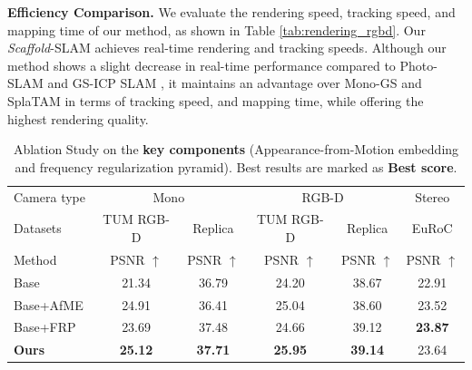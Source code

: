 \noindent\textbf{Efficiency Comparison.}
We evaluate the rendering speed, tracking speed, and mapping time of our method, as shown in Table \ref{tab:rendering_rgbd}. Our \emph{Scaffold}-SLAM achieves real-time rendering and tracking speeds.  Although our method shows a slight decrease in real-time performance compared to Photo-SLAM \cite{Photo-SLAM2024} and GS-ICP SLAM \cite{GS-ICPSLAM2024}, it maintains an advantage over Mono-GS \cite{MonoGS2024} and SplaTAM \cite{SplaTAM2024} in terms of tracking speed, and mapping time, while offering the highest rendering quality.


\begin{table}
\scriptsize
  \centering
   \setlength\tabcolsep{4.5pt} 
  \begin{tabular}{@{}l|cc|cc|c} %
    \hline  
   Camera type & \multicolumn{2}{c|}{Mono} & \multicolumn{2}{c|}{RGB-D} & Stereo\\
   Datasets & TUM RGB-D & Replica & TUM RGB-D & Replica & EuRoC \\
   Method &  PSNR $\uparrow$ &  PSNR $\uparrow$  &  PSNR $\uparrow$ &  PSNR $\uparrow$  &  PSNR $\uparrow$  \\
    \hline   
       Base & 21.34 & 36.79 & 24.20 & 38.67 &	22.91 \\
       Base+AfME & 24.91 & 36.41 & 25.04 & 38.60 &	23.52 \\
       Base+FRP & 23.69 & 37.48 & 24.66 & 39.12 &	{\bf 23.87} \\
       \hline
       {\bf Ours}  & {\bf 25.12} & {\bf 37.71} & {\bf 25.95} &  {\bf 39.14} &	23.64 \\
    \hline
  \end{tabular}
  \caption{ Ablation Study on the {\bf key components} (Appearance-from-Motion embedding and frequency regularization pyramid). Best results are marked as  {\bf Best score}.}
  \label{tab:ablation1}
\end{table}

